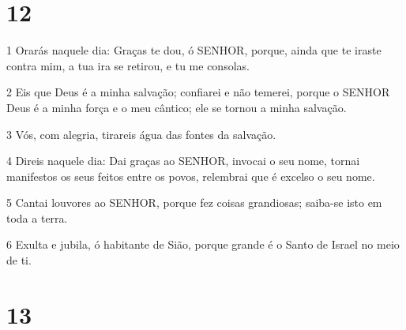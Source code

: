 \chapter{12}

\par 1 Orarás naquele dia: Graças te dou, ó SENHOR, porque, ainda que te iraste contra mim, a tua ira se retirou, e tu me consolas.
\par 2 Eis que Deus é a minha salvação; confiarei e não temerei, porque o SENHOR Deus é a minha força e o meu cântico; ele se tornou a minha salvação.
\par 3 Vós, com alegria, tirareis água das fontes da salvação.
\par 4 Direis naquele dia: Dai graças ao SENHOR, invocai o seu nome, tornai manifestos os seus feitos entre os povos, relembrai que é excelso o seu nome.
\par 5 Cantai louvores ao SENHOR, porque fez coisas grandiosas; saiba-se isto em toda a terra.
\par 6 Exulta e jubila, ó habitante de Sião, porque grande é o Santo de Israel no meio de ti.

\chapter{13}

